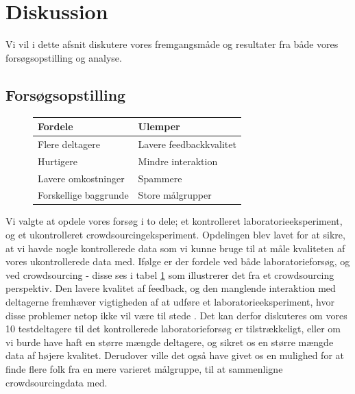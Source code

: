 \chapter*{Diskussion}
Vi vil i dette afsnit diskutere vores fremgangsmåde og resultater fra både vores forsøgsopstilling og analyse.

\section*{Forsøgsopstilling}

\begin{figure}
	\centering
	\begin{tabular}{ll}
		\textbf{Fordele} & \textbf{Ulemper}\\\hline
		Flere deltagere & Lavere feedbackkvalitet\\
		Hurtigere & Mindre interaktion\\
		Lavere omkostninger & Spammere\\
		Forskellige baggrunde & Store målgrupper\\
	\end{tabular}
	\label{tab:fordeleogulemper}
\end{figure}

Vi valgte at opdele vores forsøg i to dele; et kontrolleret laboratorieeksperiment, og et ukontrolleret crowdsourcingeksperiment. Opdelingen blev lavet for at sikre, at vi havde nogle kontrollerede data som vi kunne bruge til at måle kvaliteten af vores ukontrollerede data med. Ifølge \cite{liu2012crowdsourcing} er der fordele ved både laboratorieforsøg, og ved crowdsourcing - disse ses i tabel \ref{tab:fordeleogulemper} som illustrerer det fra et crowdsourcing perspektiv. Den lavere kvalitet af feedback, og den manglende interaktion med deltagerne fremhæver vigtigheden af at udføre et laboratorieeksperiment, hvor disse problemer netop ikke vil være til stede \cite{liu2012crowdsourcing}. Det kan derfor diskuteres om vores 10 testdeltagere til det kontrollerede laboratorieforsøg er tilstrækkeligt, eller om vi burde have haft en større mængde deltagere, og sikret os en større mængde data af højere kvalitet. Derudover ville det også have givet os en mulighed for at finde flere folk fra en mere varieret målgruppe, til at sammenligne crowdsourcingdata med.


